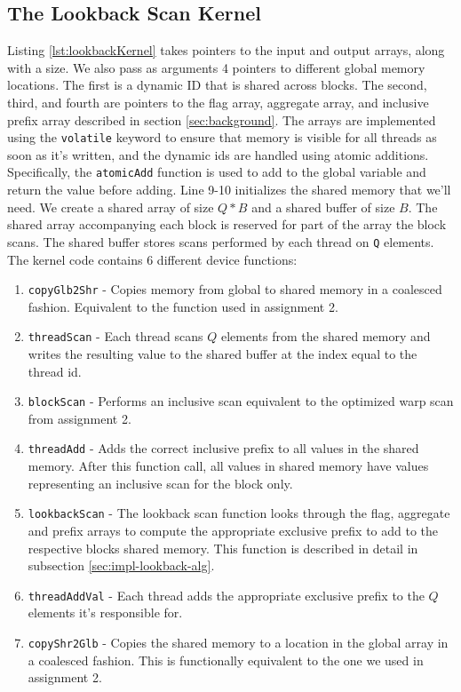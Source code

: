 \documentclass[twocolumn]{article}
\begin{document}
\subsection{The Lookback Scan Kernel}
\label{sec:impl-lookback-kernel}
Listing \ref{lst:lookbackKernel} takes pointers to the input and output arrays, along with a size. We also pass as arguments 4 pointers to different global memory locations. The first is a dynamic ID that is shared across blocks. The second, third, and fourth are pointers to the flag array, aggregate array, and inclusive prefix array described in section \ref{sec:background}. The arrays are implemented using the \verb|volatile| keyword to ensure that memory is visible for all threads as soon as it's written, and the dynamic ids are handled using atomic additions. Specifically, the \verb|atomicAdd| function is used to add to the global variable and return the value before adding. Line 9-10 initializes the shared memory that we'll need. We create a shared array of size $Q * B$ and a shared buffer of size $B$. The shared array accompanying each block is reserved for part of the array the block scans. The shared buffer stores scans performed by each thread on \verb|Q| elements. The kernel code contains 6 different device functions:
\begin{enumerate}[leftmargin=*]
    \itemsep0em
    \item \verb|copyGlb2Shr| - Copies memory from global to shared memory in a coalesced fashion. Equivalent to the function used in assignment 2.
    \item \verb|threadScan| - Each thread scans $Q$ elements from the shared memory and writes the resulting value to the shared buffer at the index equal to the thread id.
    \item \verb|blockScan| - Performs an inclusive scan equivalent to the optimized warp scan from assignment 2.
    \item \verb|threadAdd| - Adds the correct inclusive prefix to all values in the shared memory. After this function call, all values in shared memory have values representing an inclusive scan for the block only.
    \item \verb|lookbackScan| - The lookback scan function looks through the flag, aggregate and prefix arrays to compute the appropriate exclusive prefix to add to the respective blocks shared memory. This function is described in detail in subsection \ref{sec:impl-lookback-alg}.
    \item \verb|threadAddVal| - Each thread adds the appropriate exclusive prefix to the $Q$ elements it's responsible for.
    \item \verb|copyShr2Glb| - Copies the shared memory to a location in the global array in a coalesced fashion. This is functionally equivalent to the one we used in assignment 2.
\end{enumerate}
\end{document}
